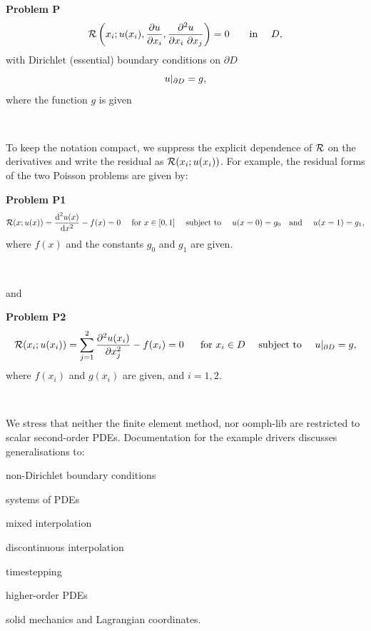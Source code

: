 \begin{center} \begin{TabularC}{1}
\hline
\begin{center} {\bfseries  Problem P } \[ {\cal R}\left(x_i; u(x_i), \frac{\partial u}{\partial x_i}, \frac{\partial^2 u}{\partial x_i \ \partial x_j}\right) = 0 \ \mbox{ \ \ \ \ in \ \ \ } D,\] with Dirichlet (essential) boundary conditions on $ \partial D $ \[ \hfill u|_{\partial D} = g, \] where the function $g$ is given \end{center}    \\
\end{TabularC}
\end{center} 

To keep the notation compact, we suppress the explicit dependence of $ {\cal R} $ on the derivatives and write the residual as $ {\cal R}(x_i; u(x_i))$. For example, the residual forms of the two Poisson problems are given by\-: \begin{center} \begin{TabularC}{1}
\hline
\begin{center} {\bfseries  Problem P1 } \[ {\cal R}(x; u(x)) = \frac{\mbox{d}^2 u(x)}{\mbox{d} x^2} - f(x) =0 \mbox{\ \ \ \ for $x\in[0,1]$ \ \ \ subject to \ \ \ } u(x=0)= g_0 \mbox{\ \ \ and \ \ \ } u(x=1)= g_1, \] where $ f(x)$ and the constants $g_0$ and $g_1$ are given. \end{center}    \\
\end{TabularC}
\end{center} 

and

\begin{center} \begin{TabularC}{1}
\hline
\begin{center} {\bfseries  Problem P2 } \[ {\cal R}(x_i; u(x_i)) = \sum_{j=1}^2 \frac{\partial^2 u(x_i)}{\partial x_j^2} - f(x_i) =0 \mbox{ \ \ \ \ for $x_i\in D$ \ \ \ subject to \ \ \ } u|_{\partial D} = g, \] where $ f(x_i)$ and $ g(x_i)$ are given, and $ i = 1,2$. \end{center}    \\
\end{TabularC}
\end{center} 

We stress that neither the finite element method, nor {\ttfamily oomph-\/lib} are restricted to scalar second-\/order P\-D\-Es. Documentation for the example drivers discusses generalisations to\-:
\begin{DoxyItemize}
\item non-\/\-Dirichlet boundary conditions
\item systems of P\-D\-Es
\item mixed interpolation
\item discontinuous interpolation
\item timestepping
\item higher-\/order P\-D\-Es
\item solid mechanics and Lagrangian coordinates.
\end{DoxyItemize}




